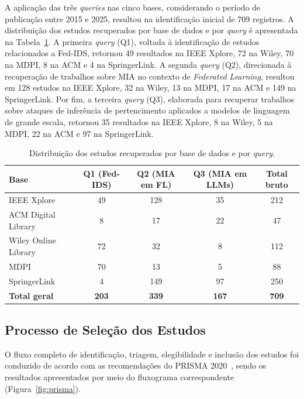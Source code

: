 \documentclass[
	12pt,				%
	openright,			%
	oneside,			%
	a4paper,			%
	english,			%
	french,				%
	spanish,			%
	brazil,				%
	]{abntex2}
\begin{document}
A aplicação das três \textit{queries} nas cinco bases, considerando o período de publicação entre 2015 e 2025, resultou na identificação inicial de 709 registros. A distribuição dos estudos recuperados por base de dados e por \textit{query} é apresentada na Tabela~\ref{tab:queries_resultados}. A primeira \textit{query} (Q1), voltada à identificação de estudos relacionados a Fed-IDS, retornou 49 resultados na IEEE Xplore, 72 na Wiley, 70 na MDPI, 8 na ACM e 4 na SpringerLink. A segunda \textit{query} (Q2), direcionada à recuperação de trabalhos sobre MIA no contexto de \textit{Federated Learning}, resultou em 128 estudos na IEEE Xplore, 32 na Wiley, 13 na MDPI, 17 na ACM e 149 na SpringerLink. Por fim, a terceira \textit{query} (Q3), elaborada para recuperar trabalhos sobre ataques de inferência de pertencimento aplicados a modelos de linguagem de grande escala, retornou 35 resultados na IEEE Xplore, 8 na Wiley, 5 na MDPI, 22 na ACM e 97 na SpringerLink.

\begin{table}[H]
\centering
\caption{Distribuição dos estudos recuperados por base de dados e por \textit{query}.}
\label{tab:queries_resultados}
\begin{tabular}{lcccc}
\hline
\textbf{Base} & \textbf{Q1 (Fed-IDS)} & \textbf{Q2 (MIA em FL)} & \textbf{Q3 (MIA em LLMs)} & \textbf{Total bruto} \\
\hline
IEEE Xplore & 49 & 128 & 35 & 212 \\
ACM Digital Library & 8 & 17 & 22 & 47 \\
Wiley Online Library & 72 & 32 & 8 & 112 \\
MDPI & 70 & 13 & 5 & 88 \\
SpringerLink & 4 & 149 & 97 & 250 \\
\hline
\textbf{Total geral} & \textbf{203} & \textbf{339} & \textbf{167} & \textbf{709} \\
\hline
\end{tabular}
\end{table}

\subsection{Processo de Seleção dos Estudos}

O fluxo completo de identificação, triagem, elegibilidade e inclusão dos estudos foi conduzido de acordo com as recomendações do PRISMA 2020~\cite{page2021prisma}, sendo os resultados apresentados por meio do fluxograma correspondente (Figura~\ref{fig:prisma}).
\end{document}
